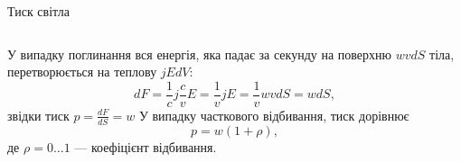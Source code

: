 \documentclass{beamer}
\begin{document}
\begin{frame}{Тиск світла}{}
\begin{columns}
\begin{column}{0.6\linewidth}
\begin{block}{}
				\begin{overprint}
					У випадку поглинання вся енергія, яка падає за секунду на поверхню $wv dS$ тіла, перетворюється на теплову $ jE dV $:
					\begin{equation*}
						dF = \frac1c j \frac{c}{v}E = \frac1vjE = \frac1v wvdS = w dS,
					\end{equation*}
					звідки тиск $ p = \frac{dF}{dS} = w $
				\onslide<2>
					У випадку часткового відбивання, тиск дорівнює
					\begin{equation*}
						p = w (1 + \rho),
					\end{equation*}
					де $ \rho = 0 \ldots 1$ --- коефіцієнт відбивання.
				\end{overprint}
			\end{block}
		\end{column}
	\end{columns}
\end{frame}
\end{document}
